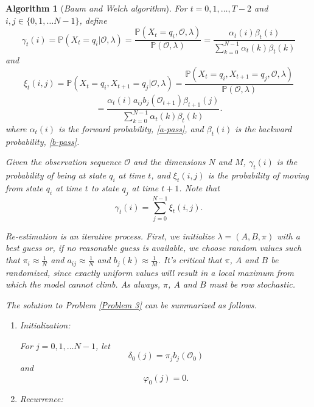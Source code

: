 \documentclass[12pt]{article}
\newtheorem{algorithm2}{Algorithm}
\def\OO{\mathcal{O}}
\def\PP{\mathbb{P}}
\numberwithin{equation}{section}
\begin{document}
\begin{algorithm2}[\emph{Baum and Welch algorithm}]\label{Baum and Welch algorithm}
\normalfont For $t = 0,1, \dots, T-2$ and $i, j \in \{0,1, \dots N-1\}$, define
\begin{equation}\label{gamma}
    \gamma_{t}(i) = \PP(X_{t} = q_{i} | \OO, \lambda) = \frac{\PP(X_{t} = q_{i}, \OO, \lambda)}{\PP(\OO, \lambda)} = \frac{\alpha_{t}(i) \beta_{t}(i)}{\displaystyle\sum_{k=0}^{N-1} \alpha_{t}(k) \beta_{t}(k)}
\end{equation}
and \[\xi_{t}(i,j) = \PP(X_{t} = q_{i}, X_{t+1} = q_{j} | \OO, \lambda) = \frac{\PP(X_{t} = q_{i}, X_{t+1} = q_{j}, \OO, \lambda)}{\PP(\OO, \lambda)}\]
\begin{equation}\label{xi}
     = \frac{\alpha_{t}(i) a_{ij} b_{j}(\OO_{t+1}) \beta_{t+1}(j)}{\displaystyle\sum_{k=0}^{N-1} \alpha_{t}(k) \beta_{t}(k)}.
\end{equation}
where $\alpha_{t}(i)$ is the forward probability, \ref{a-pass}, and $\beta_{t}(i)$ is the backward probability, \ref{b-pass}.

Given the observation sequence $\OO$ and the dimensions $N$ and $M$, $\gamma_{t}(i)$ is the probability of being at state $q_{i}$ at time $t$, and $\xi_{t}(i,j)$ is the probability of moving from state $q_{i}$ at time $t$ to state $q_{j}$ at time $t+1$. Note that
\begin{equation}\label{gamma xi}
     \gamma_{t}(i) = \sum_{j=0}^{N-1} \xi_{t}(i,j).
\end{equation}

Re-estimation is an iterative process. First, we initialize $\lambda = (A,B, \pi)$ with a best guess or, if no reasonable guess is available, we choose random values such that $\pi_{i} \approx \frac{1}{N}$ and $a_{ij} \approx \frac{1}{N}$ and $b_{j}(k) \approx \frac{1}{M}$. It's critical that $\pi$, $A$ and $B$ be randomized, since exactly uniform values will result in a local maximum from which the model cannot climb. As always, $\pi$, $A$ and $B$ must be row stochastic.

The solution to Problem \ref{Problem 3} can be summarized as follows.

\begin{enumerate}
    \item Initialization:

    For $j = 0,1, \dots N-1$, let
    \[\delta_{0}(j) = \pi_{j} b_{j}(\OO_{0})\] and \[\varphi_{0}(j) = 0.\]

    \item Recurrence:


\end{enumerate}
\end{algorithm2}
\end{document}
